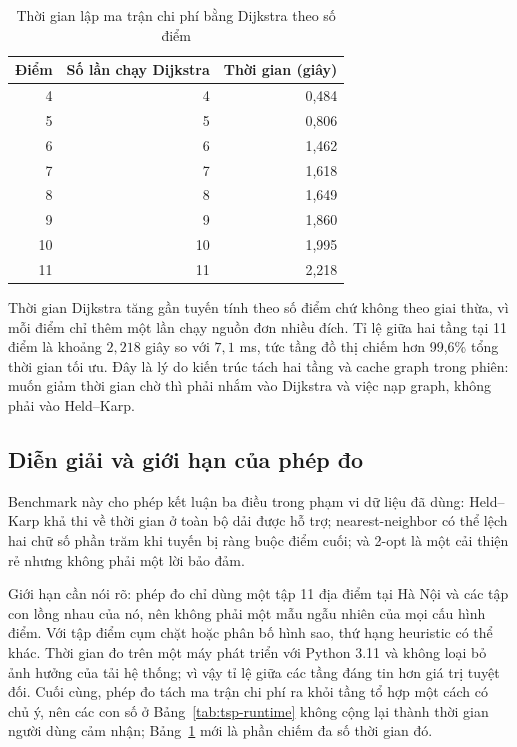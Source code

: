 \begin{table}[H]
\centering
\caption{Thời gian lập ma trận chi phí bằng Dijkstra theo số điểm}
\label{tab:dijkstra-scaling}
\begin{tabular}{r r r}
\toprule
\textbf{Điểm} & \textbf{Số lần chạy Dijkstra} & \textbf{Thời gian (giây)} \\
\midrule
4 & 4 & 0,484 \\
5 & 5 & 0,806 \\
6 & 6 & 1,462 \\
7 & 7 & 1,618 \\
8 & 8 & 1,649 \\
9 & 9 & 1,860 \\
10 & 10 & 1,995 \\
11 & 11 & 2,218 \\
\bottomrule
\end{tabular}
\end{table}

Thời gian Dijkstra tăng gần tuyến tính theo số điểm chứ không theo giai thừa, vì
mỗi điểm chỉ thêm một lần chạy nguồn đơn nhiều đích. Tỉ lệ giữa hai tầng tại 11
điểm là khoảng $2{,}218$ giây so với $7{,}1$ ms, tức tầng đồ thị chiếm hơn 99,6\%
tổng thời gian tối ưu. Đây là lý do kiến trúc tách hai tầng và cache graph trong
phiên: muốn giảm thời gian chờ thì phải nhắm vào Dijkstra và việc nạp graph, không
phải vào Held--Karp.

\subsection{Diễn giải và giới hạn của phép đo}

Benchmark này cho phép kết luận ba điều trong phạm vi dữ liệu đã dùng: Held--Karp
khả thi về thời gian ở toàn bộ dải được hỗ trợ; nearest-neighbor có thể lệch hai
chữ số phần trăm khi tuyến bị ràng buộc điểm cuối; và 2-opt là một cải thiện rẻ
nhưng không phải một lời bảo đảm.

Giới hạn cần nói rõ: phép đo chỉ dùng một tập 11 địa điểm tại Hà Nội và các tập
con lồng nhau của nó, nên không phải một mẫu ngẫu nhiên của mọi cấu hình điểm. Với
tập điểm cụm chặt hoặc phân bố hình sao, thứ hạng heuristic có thể khác. Thời gian
đo trên một máy phát triển với Python 3.11 và không loại bỏ ảnh hưởng của tải hệ
thống; vì vậy tỉ lệ giữa các tầng đáng tin hơn giá trị tuyệt đối. Cuối cùng, phép
đo tách ma trận chi phí ra khỏi tầng tổ hợp một cách có chủ ý, nên các con số ở
Bảng~\ref{tab:tsp-runtime} không cộng lại thành thời gian người dùng cảm nhận;
Bảng~\ref{tab:dijkstra-scaling} mới là phần chiếm đa số thời gian đó.

